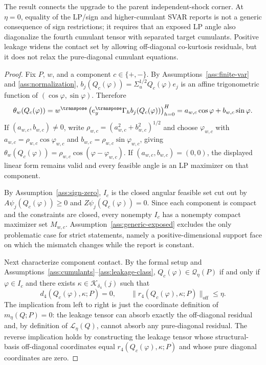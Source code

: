 The result connects the upgrade to the parent independent-shock corner.  At \(\eta=0\), equality of the LP/sign and higher-cumulant SVAR reports is not a generic consequence of sign restrictions; it requires that an exposed LP angle also diagonalize the fourth cumulant tensor with separated target cumulants.  Positive leakage widens the contact set by allowing off-diagonal co-kurtosis residuals, but it does not relax the pure-diagonal cumulant equations.

\begin{proof}
Fix \(P\), \(w\), and a component \(c\in\{+,-\}\).  By Assumptions~\ref{ass:finite-var} and \ref{ass:normalization}, \(b_j(Q_c(\varphi))=\Sigma_u^{1/2}Q_c(\varphi)e_j\) is an affine trigonometric function of \((\cos\varphi,\sin\varphi)\).  Therefore
\[
\theta_w(Q_c(\varphi))
=w^\transpose\left(e_y^\transpose\Gamma_h b_j(Q_c(\varphi))\right)_{h=0}^H
=a_{w,c}\cos\varphi+b_{w,c}\sin\varphi .
\]
If \((a_{w,c},b_{w,c})\ne0\), write \(\rho_{w,c}=(a_{w,c}^2+b_{w,c}^2)^{1/2}\) and choose \(\varphi_{w,c}\) with \(a_{w,c}=\rho_{w,c}\cos\varphi_{w,c}\) and \(b_{w,c}=\rho_{w,c}\sin\varphi_{w,c}\), giving \(\theta_w(Q_c(\varphi))=\rho_{w,c}\cos(\varphi-\varphi_{w,c})\).  If \((a_{w,c},b_{w,c})=(0,0)\), the displayed linear form remains valid and every feasible angle is an LP maximizer on that component.

By Assumption~\ref{ass:sign-zero}, \(I_c\) is the closed angular feasible set cut out by \(A\psi_j(Q_c(\varphi))\ge0\) and \(Z\psi_j(Q_c(\varphi))=0\).  Since each component is compact and the constraints are closed, every nonempty \(I_c\) has a nonempty compact maximizer set \(M_{w,c}\).  Assumption~\ref{ass:generic-exposed} excludes the only problematic case for strict statements, namely a positive-dimensional support face on which the mismatch changes while the report is constant.

Next characterize component contact.  By the formal setup and Assumptions~\ref{ass:cumulants}--\ref{ass:leakage-class}, \(Q_c(\varphi)\in\mathcal Q_\eta(P)\) if and only if \(\varphi\in I_c\) and there exists \(\kappa\in\mathcal K_{\delta_4}(j)\) such that
\[
d_4(Q_c(\varphi),\kappa;P)=0,
\qquad
\|r_4(Q_c(\varphi),\kappa;P)\|_{\mathrm{off}}\le\eta .
\]
The implication from left to right is just the coordinate definition of \(m_\eta(Q;P)=0\): the leakage tensor can absorb exactly the off-diagonal residual and, by definition of \(\mathcal L_\eta(Q)\), cannot absorb any pure-diagonal residual.  The reverse implication holds by constructing the leakage tensor whose structural-basis off-diagonal coordinates equal \(r_4(Q_c(\varphi),\kappa;P)\) and whose pure diagonal coordinates are zero.


\end{proof}
